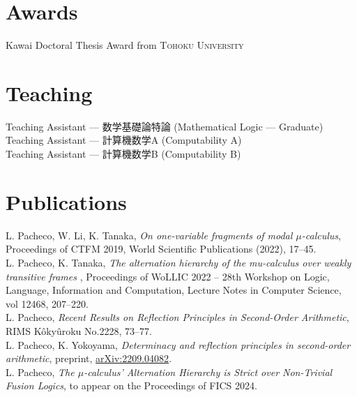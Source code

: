 \documentclass[11pt, a4paper]{article}
\newcommand{\years}[1]{\marginnote{\scriptsize #1}}
\begin{document}
\section*{Awards}
\years{2023} Kawai Doctoral Thesis Award from \textsc{Tohoku University}


\newpage

\section*{Teaching}
\years{2021} Teaching Assistant --- 数学基礎論特論 (Mathematical Logic --- Graduate)\\
\years{2021} Teaching Assistant --- 計算機数学A  (Computability A)\\
\years{2022} Teaching Assistant --- 計算機数学B  (Computability B)\\


\section*{Publications}
\noindent L. Pacheco, W. Li, K. Tanaka, \emph{On one-variable fragments of modal $\mu$-calculus}, Proceedings of CTFM 2019, World Scientific Publications (2022), 17--45. \\


L. Pacheco, K. Tanaka, \emph{The alternation hierarchy of the mu-calculus over weakly transitive frames} , Proceedings of WoLLIC 2022 – 28th Workshop on Logic, Language, Information and Computation, Lecture Notes in Computer Science, vol 12468, 207--220. \\

L. Pacheco, \emph{Recent Results on Reflection Principles in Second-Order Arithmetic}, RIMS Kôkyûroku No.2228, 73--77. \\

L. Pacheco, K. Yokoyama, \emph{Determinacy and reflection principles in second-order arithmetic}, preprint, \href{https://arxiv.org/abs/2209.04082}{arXiv:2209.04082}. \\

L. Pacheco, \emph{The $\mu$-calculus' Alternation Hierarchy is Strict over Non-Trivial Fusion Logics}, to appear on the Proceedings of FICS 2024. \\
\end{document}
